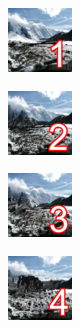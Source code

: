 \newpage







\taskeleven

\begin{task}
    \begin{gridlayout}{\textwidth}{12cm}
        \begin{row}{0.33}
            \begin{cell}{0.25}
                \centering
                \includegraphics[width=0.9\cellwidth]{doc-one/img/thumbnail-1.png}
            \end{cell}
            \begin{cell}{0.25}
                \centering
                \includegraphics[width=0.9\cellwidth]{doc-one/img/thumbnail-2.png}
            \end{cell}
            \begin{cell}{0.25}
                \centering
                \includegraphics[width=0.9\cellwidth]{doc-one/img/thumbnail-3.png}
            \end{cell}
            \begin{cell}{0.25}
                \centering
                \includegraphics[width=0.9\cellwidth]{doc-one/img/thumbnail-4.png}
            \end{cell}
        \end{row}

\end{gridlayout}
\end{task}
